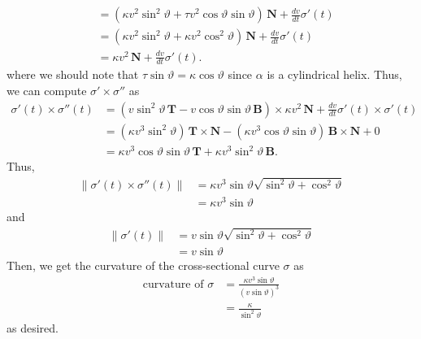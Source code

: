 \documentclass[12 pt, letterpaper]{hmcpset}
\begin{document}
\begin{solution}
\begin{enumerate}
\[\begin{split}
						    & = (\kappa v^{2} \sin^{2}{\vartheta} + \tau v^{2} \cos{\vartheta} \sin{\vartheta}) \, \mathbf{N} + \frac{dv}{dt} \sigma'(t) \\
						    & = (\kappa v^{2} \sin^{2}{\vartheta} + \kappa v^{2} \cos^{2}{\vartheta} ) \, \mathbf{N} + \frac{dv}{dt} \sigma'(t) \\
						    & = \kappa v^{2} \, \mathbf{N} + \frac{dv}{dt} \sigma'(t).
				\end{split}
			\]
			where we should note that $\tau \sin{\vartheta} = \kappa \cos{\vartheta}$ since $\alpha$ is a cylindrical helix.
			Thus, we can compute $\sigma' \times \sigma''$ as
			\[
				\begin{split}
					\sigma'(t) \times \sigma''(t) & = (v \sin^{2}{\vartheta} \, \mathbf{T} - v \cos{\vartheta} \sin{\vartheta} \, \mathbf{B}) \times \kappa v^{2} \, \mathbf{N} + \frac{dv}{dt} \sigma'(t) \times \sigma'(t) \\
								      & = (\kappa v^{3} \sin^{2}{\vartheta}) \, \mathbf{T} \times \mathbf{N} - (\kappa v^{3} \cos{\vartheta} \sin{\vartheta}) \, \mathbf{B} \times \mathbf{N} + 0 \\
								      & = \kappa v^{3} \cos{\vartheta} \sin{\vartheta} \, \mathbf{T} + \kappa v^{3} \sin^{2}{\vartheta} \, \mathbf{B}.
				\end{split}
			\]
			Thus,
			\[
				\begin{split}
					\lVert \sigma'(t) \times \sigma''(t) \rVert & = \kappa v^{3} \sin{\vartheta} \sqrt{\sin^{2}{\vartheta} + \cos^{2}{\vartheta}} \\
										    & = \kappa v^{3} \sin{\vartheta}
				\end{split}
			\]
			and
			\[
				\begin{split}
					\lVert \sigma'(t) \rVert & = v \sin{\vartheta}\sqrt{\sin^{2}{\vartheta} + \cos^{2}{\vartheta}} \\
								 & = v \sin{\vartheta}
				\end{split}
			\]
			Then, we get the curvature of the cross-sectional curve $\sigma$ as
			\[
				\begin{split}
					\text{curvature of } \sigma & = \frac{\kappa v^{3} \sin{\vartheta}}{(v \sin{\vartheta})^{3}} \\
								    & = \frac{\kappa}{\sin^{2}{\vartheta}}
				\end{split}
			\]
			as desired.
	\end{enumerate}
\end{solution}

\pagebreak
\end{document}
